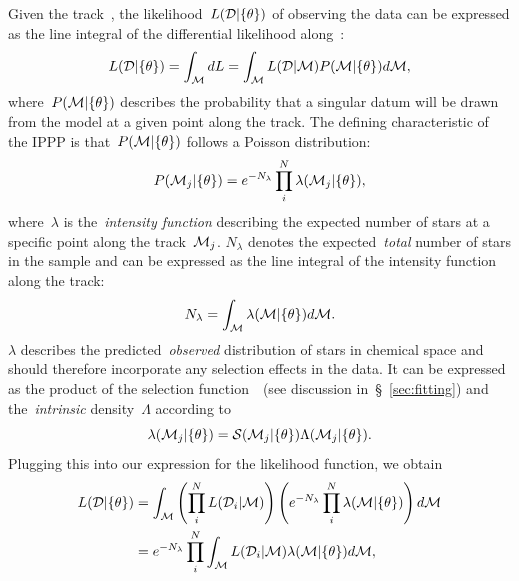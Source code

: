 \documentclass[ms.tex]{subfiles}
\begin{document}
\par
Given the track~, the likelihood~$L(\mathcal{D} | \{\theta\})$ of
observing the data can be expressed as the line integral of the differential
likelihood along~:
\begin{equation}
L(\mathcal{D} | \{\theta\}) = \int_{\mathcal{M}} dL =
\int_{\mathcal{M}} L(\mathcal{D} | \mathcal{M}) P(\mathcal{M} | \{\theta\})
d\mathcal{M},
\end{equation}
where~$P(\mathcal{M} | \{\theta\})$ describes the probability that a singular
datum will be drawn from the model at a given point along the track.
The defining characteristic of the IPPP is that~$P(\mathcal{M} | \{\theta\})$
follows a Poisson distribution:
\begin{equation}
P(\mathcal{M}_j | \{\theta\}) = e^{-N_\lambda}
\prod_i^N \lambda (\mathcal{M}_j | \{\theta\}),
\end{equation}
where~$\lambda$ is the~\textit{intensity function} describing the expected
number of stars at a specific point along the track~$\mathcal{M}_j$.
$N_\lambda$ denotes the expected~\textit{total} number of stars in the sample
and can be expressed as the line integral of the intensity function along the
track:
\begin{equation}
N_\lambda = \int_{\mathcal{M}} \lambda(\mathcal{M} | \{\theta\}) d\mathcal{M}.
\end{equation}
$\lambda$ describes the predicted~\textit{observed} distribution of stars in
chemical space and should therefore incorporate any selection effects in the
data.
It can be expressed as the product of the selection function~~(see
discussion in~\S~\ref{sec:fitting}) and the~\textit{intrinsic}
density~$\Lambda$ according to
\begin{equation}
\lambda(\mathcal{M}_j | \{\theta\}) = \mathcal{S}(\mathcal{M}_j | \{\theta\})
\Lambda(\mathcal{M}_j | \{\theta\}).
\end{equation}
Plugging this into our expression for the likelihood function, we obtain
\begin{subequations}\begin{align}
L(\mathcal{D} | \{\theta\}) &= \int_{\mathcal{M}}
\left(\prod_i^N L(\mathcal{D}_i | \mathcal{M})\right)
\left(e^{-N_\lambda} \prod_i^N \lambda(\mathcal{M} | \{\theta\})\right)
d\mathcal{M}
\\
&= e^{-N_\lambda} \prod_i^N \int_{\mathcal{M}} L(\mathcal{D}_i | \mathcal{M})
\lambda(\mathcal{M} | \{\theta\}) d\mathcal{M},
\end{align}\end{subequations}
\end{document}
